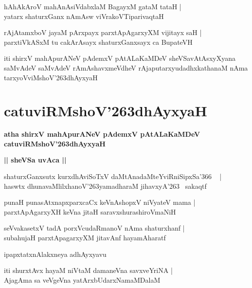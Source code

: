 \documentclass[twoside,12pt,openright]{book}
\def\S{\char'263}
\newcounter{shloka}[chapter]
\def\uvaca#1{\centerline{{\large\textbf{#1}}}}
\begin{document}
\begin{shloka}%
hAhAkAroV mahAnAsiVdabxlaM BagayxM gataM tataH |\\
yatarx shaturxGanx nAmAsw viVrakoVTiparivaqtaH 
\end{shloka}

\begin{shloka}%
rAjAtamxboV jayaM pArxpayx parxtApAgarxyXM vijitayx saH |\\
parxtiVkASxM tu cakArAsayx shaturxGanxsayx ca BupateVH
\end{shloka}

\begin{center}
iti shirxV mahApurANeV pAdemxV pAtALaKaMDeV sheVSavAtAsxyXyana saMvAdeV 
saMvAdeV rAmAshavxmeVdheV rAjaputarxyudadhxkathanaM nAma tarxyoVviMshoV\S dhAyxyaH
\end{center}

\chapter{catuviRMshoV\S dhAyxyaH}

\begin{center}
{\LARGE\bfseries atha shirxV mahApurANeV pAdemxV pAtALaKaMDeV catuviRMshoV\S dhAyxyaH}
\end{center}

\uvaca{|| sheVSa uvAca ||}


\begin{shloka}%
shaturxGanxsutx kurxdhAviSoTxV daMtAnadaMteYviRniSipxSa\char'366 ~ |\\
haswtx dhunavaMlilxhanoV\S yamadharaM jihavxyA\S ~ sakaqtf 
\end{shloka}

\begin{shloka}%
punaH punasAtxnapxparxcaCx keVnAshopxV niVyateV mama |\\
parxtApAgarxyXH keVna jitaH saravxshurashiroVmaNiH 
\end{shloka}

\begin{shloka}%
seVvakasetxV tadA porxVcudaRmanoV nAma shaturxhanf |\\
subahujaH parxtApagarxyXM jitavAnf hayamAharatf
\end{shloka}

\begin{center}
ipapxtatxnAlakxneya adhAyxyavu
\end{center}

\begin{shloka}%
iti shurxtAvx hayaM niVtaM damaneVna savxveYriNA |\\
AjagAma sa veVgeVna yatArxbUdarxNamaMDalaM 
\end{shloka}
\end{document}
